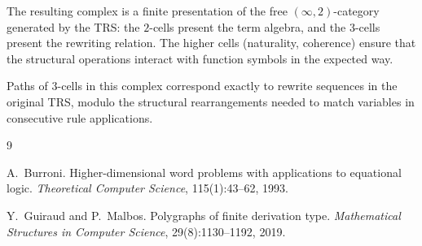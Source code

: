\documentclass[acmsmall,screen,nonacm]{acmart}
\begin{document}
The resulting complex is a finite presentation of the free
$(\infty, 2)$-category generated by the TRS: the $2$-cells present the
term algebra, and the $3$-cells present the rewriting relation.  The
higher cells (naturality, coherence) ensure that the structural
operations interact with function symbols in the expected way.

Paths of $3$-cells in this complex correspond exactly to rewrite
sequences in the original TRS, modulo the structural rearrangements
needed to match variables in consecutive rule applications.


\begin{thebibliography}{9}

A.~Burroni.
\newblock Higher-dimensional word problems with applications to equational
  logic.
\newblock \emph{Theoretical Computer Science}, 115(1):43--62, 1993.

Y.~Guiraud and P.~Malbos.
\newblock Polygraphs of finite derivation type.
\newblock \emph{Mathematical Structures in Computer Science},
  29(8):1130--1192, 2019.

\end{thebibliography}
\end{document}
